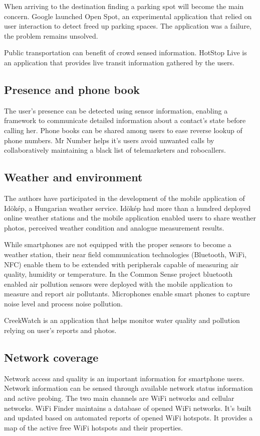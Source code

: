 \documentclass[conference,letterpaper]{IEEEtran}
\begin{document}
When arriving to the destination finding a parking spot will become the main concern. Google launched Open Spot, an experimental application that relied on user interaction to detect freed up parking spaces. The application was a failure, the problem remains unsolved.

Public transportation can benefit of crowd sensed information. HotStop Live is an application that provides live transit information gathered by the users.

\subsection{Presence and phone book}
The user's presence can be detected using sensor information, enabling a framework to communicate detailed information about a contact's state before calling her. Phone books can be shared among users to ease reverse lookup of phone numbers. Mr Number helps it's users avoid unwanted calls by collaboratively maintaining a black list of telemarketers and robocallers.

\subsection{Weather and environment}
The authors have participated in the development of the mobile application of Id\"ok\'ep, a Hungarian weather service. Id\"ok\'ep had more than a hundred deployed online weather stations and the mobile application enabled users to share weather photos, perceived weather condition and analogue measurement results.

While smartphones are not equipped with the proper sensors to become a weather station, their near field communication technologies (Bluetooth, WiFi, NFC) enable them to be extended with peripherals capable of measuring air quality, humidity or temperature. In the  Common Sense project bluetooth enabled air pollution sensors were deployed with the mobile application to measure and report air pollutants. Microphones enable smart phones to capture noise level and process noise pollution.

CreekWatch is an application that helps monitor water quality and pollution relying on user's reports and photos.

\subsection{Network coverage}
Network access and quality is an important information for smartphone users. Network information can be sensed through available network status information and active probing. The two main channels are WiFi networks and cellular networks. WiFi Finder maintains a database of opened WiFi networks. It's built and updated based on automated reports of opened WiFi hotspots. It provides a map of the active free WiFi hotspots and their properties.
\end{document}
